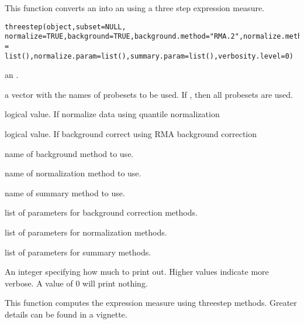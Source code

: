 \begin{Description}\relax
This function converts an  into an
 using a three step expression measure.
\end{Description}
\begin{Usage}
\begin{verbatim}
threestep(object,subset=NULL, normalize=TRUE,background=TRUE,background.method="RMA.2",normalize.method="quantile",summary.method="median.polish",background.param = list(),normalize.param=list(),summary.param=list(),verbosity.level=0)
\end{verbatim}
\end{Usage}
\begin{Arguments}
\begin{ldescription}
\item[\code{object}] an .
\item[\code{subset}] a vector with the names of probesets to be used.
If , then all probesets are used.
\item[\code{normalize}] logical value. If  normalize data using
quantile normalization
\item[\code{background}] logical value. If  background correct
using RMA background correction
\item[\code{background.method}] name of background method to use.
\item[\code{normalize.method}] name of normalization method to use.
\item[\code{summary.method}] name of summary method to use.
\item[\code{background.param}] list of parameters for background correction methods.
\item[\code{normalize.param}] list of parameters for normalization methods.
\item[\code{summary.param}] list of parameters for summary methods.
\item[\code{verbosity.level}] An integer specifying how much to print
out. Higher values indicate more verbose. A value of 0 will print nothing.
\end{ldescription}
\end{Arguments}
\begin{Details}\relax
This function computes the expression measure using threestep
methods. Greater details can be found in a vignette.
\end{Details}
